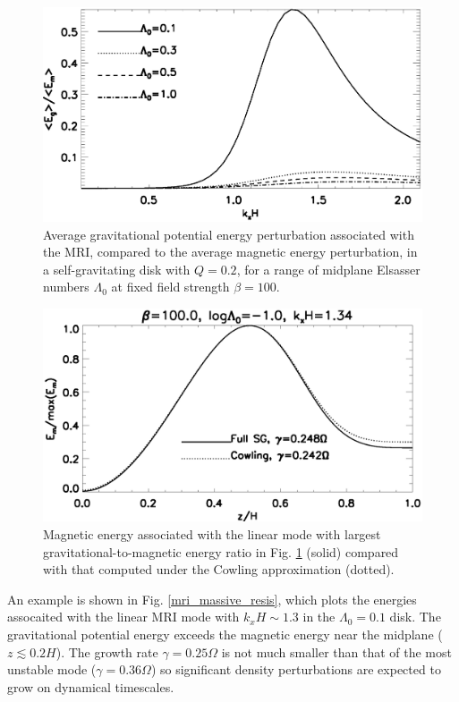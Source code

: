 \begin{figure}
  \includegraphics[width=\linewidth]{figures/compare_energy_resis}
  \caption{Average gravitational potential energy perturbation
    associated with the MRI, compared to the average magnetic energy
    perturbation, in a self-gravitating disk with $Q=0.2$,
    for a range of midplane Elsasser numbers $\Lambda_0$ at fixed
    field strength $\beta=100$.    
    \label{gravity_energy_resis}}
\end{figure}


\begin{figure}
  \includegraphics[width=\linewidth]{figures/compare_result_cowling}
  \caption{Magnetic energy associated with the linear mode with
    largest gravitational-to-magnetic energy ratio in
    Fig. \ref{gravity_energy_resis} (solid) compared with that computed
    under the Cowling approximation (dotted). 
    \label{mri_massive_cowling}}
\end{figure}


An example is shown in
Fig. \ref{mri_massive_resis}, which  plots the energies assocaited with the 
linear MRI mode with $k_xH\sim1.3$ in the $\Lambda_0=0.1$  
disk. The gravitational potential energy exceeds the
magnetic energy near the midplane ($z\lesssim0.2H$). The growth rate $\gamma=0.25\Omega$
is not much smaller than that of the most unstable mode
($\gamma=0.36\Omega$) so significant density perturbations are
expected to grow on dynamical timescales. 

